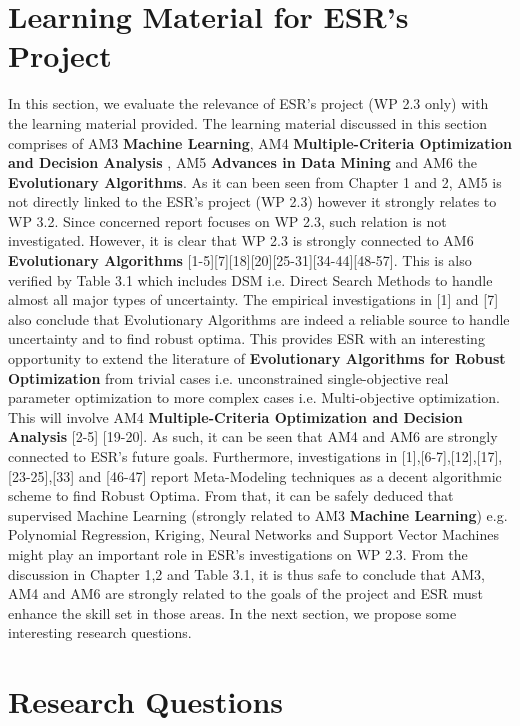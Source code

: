 \section {Learning Material for ESR's Project}

In this section, we evaluate the relevance of ESR's project (WP 2.3 only) with the learning material provided. The learning material discussed in this section comprises of AM3 \textbf{Machine Learning}, AM4 \textbf{Multiple-Criteria Optimization and Decision Analysis} , AM5 \textbf{Advances in Data Mining} and AM6 the \textbf{Evolutionary Algorithms}. As it can been seen from Chapter 1 and 2, AM5 is not directly linked to the ESR's project (WP 2.3) however it strongly relates to WP 3.2. Since concerned report focuses on WP 2.3, such relation is not investigated. However, it is clear that WP 2.3 is strongly connected to AM6 \textbf{Evolutionary Algorithms} [1-5][7][18][20][25-31][34-44][48-57]. This is also verified by Table 3.1 which includes DSM i.e. Direct Search Methods to handle almost all major types of uncertainty. The empirical investigations in [1] and [7] also conclude that Evolutionary Algorithms are indeed a reliable source to handle uncertainty and to find robust optima. This provides ESR with an interesting opportunity to extend the literature of \textbf{Evolutionary Algorithms for Robust Optimization} from trivial cases i.e. unconstrained single-objective real parameter optimization to more complex cases i.e. Multi-objective optimization. This will involve AM4 \textbf{Multiple-Criteria Optimization and Decision Analysis} [2-5] [19-20]. As such, it can be seen that AM4 and AM6 are strongly connected to ESR's future goals. Furthermore, investigations in [1],[6-7],[12],[17],[23-25],[33] and [46-47] report Meta-Modeling techniques as a decent algorithmic scheme to find Robust Optima. From that, it can be safely deduced that supervised Machine Learning (strongly related to AM3 \textbf{Machine Learning}) e.g. Polynomial Regression, Kriging, Neural Networks and Support Vector Machines might play an important role in ESR's investigations on WP 2.3. From the discussion in Chapter 1,2 and Table 3.1, it is thus safe to conclude that AM3, AM4 and AM6 are strongly related to the goals of the project and ESR must enhance the skill set in those areas. In the next section, we propose some interesting research questions. 

\section {Research Questions}

